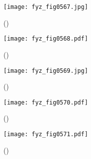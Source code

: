     \begin{figure}[ht!] %
      \centering
      \texttt{[image: fyz\_fig0567.jpg]}
      \caption{
               (\cite[s.~707]{Feynman02})}
      \label{fyz:fig0567}
    \end{figure}

    \begin{figure}[ht!] %
      \centering
      \texttt{[image: fyz\_fig0568.pdf]}
      \caption{
               (\cite[s.~707]{Feynman02})}
      \label{fyz:fig0568}
    \end{figure}

    \begin{figure}[ht!] %
      \centering
      \texttt{[image: fyz\_fig0569.jpg]}
      \caption{
               (\cite[s.~707]{Feynman02})}
      \label{fyz:fig0569}
    \end{figure}

    \begin{figure}[ht!] %
      \centering
      \texttt{[image: fyz\_fig0570.pdf]}
      \caption{
               (\cite[s.~707]{Feynman02})}
      \label{fyz:fig0570}
    \end{figure}

    \begin{figure}[ht!] %
      \centering
      \texttt{[image: fyz\_fig0571.pdf]}
      \caption{
               (\cite[s.~707]{Feynman02})}
      \label{fyz:fig0571}
    \end{figure}

